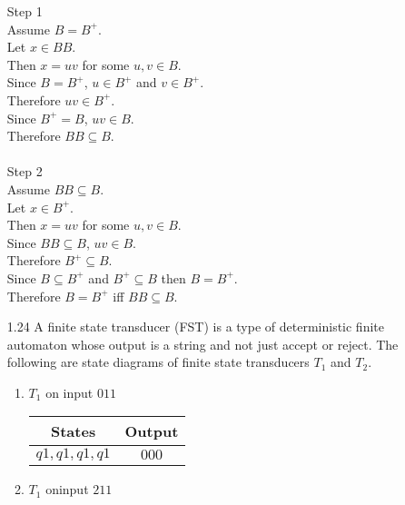 \begin{enumerate}
          Step 1\\
          Assume $B = B^+$. \\
          Let $x \in BB$. \\
          Then $x = uv$ for some $u,v \in B$. \\
          Since $B = B^+$, $u \in B^+$ and $v \in B^+$. \\
          Therefore $uv \in B^+$. \\
          Since $B^+ = B$, $uv \in B$. \\
          Therefore $BB \subseteq B$. \\
          \\
          Step 2\\
          Assume $BB \subseteq B$. \\
          Let $x \in B^+$. \\
          Then $x = uv$ for some $u,v \in B$. \\
          Since $BB \subseteq B$, $uv \in B$. \\
          Therefore $B^+ \subseteq B$. \\
          Since $B \subseteq B^+$ and $B^+ \subseteq B$ then $B = B^+$. \\
          Therefore $B = B^+$ iff $BB \subseteq B$. \\
    \item [1.24]
          A finite state transducer (FST) is a type of deterministic finite automaton whose output is a string and not just accept or reject. The following are state diagrams of finite state transducers $T_1$ and $T_2$.
          \begin{enumerate}
              \item $T_1$ on input $011$
                    \begin{table}[H]
                        \centering
                        \begin{tabular}{|c|c|}
                            \hline
                            States        & Output \\
                            \hline
                            $q1,q1,q1,q1$ & $000$  \\
                            \hline
                        \end{tabular}
                    \end{table}
              \item $T_1$ oninput $211$
                    \begin{table}[H]
                        \centering

\end{table}
\end{enumerate}
\end{enumerate}
